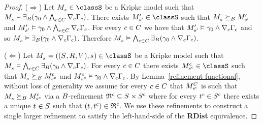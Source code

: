 \begin{proof}
($\Rightarrow$)
Let $\kPModel{\kStateS} \in \classS$ be a Kripke model such that $\kPModel{\kStateS} \entails \somerefsBs (\gamma_0 \land \bigwedge_{\agentC \in \agentsC} \coversC \Gamma_\agentC)$.
There exists $\kPModelP{\kStateSP} \in \classS$ such that $\kPModel{\kStateS} \simulatesBs \kPModelP{\kStateSP}$ and $\kPModelP{\kStateSP} \entails \gamma_0 \land \bigwedge_{\agentC \in \agentsC} \coversC \Gamma_\agentC$.
For every $\agentC \in \agentsC$ we have that $\kPModelP{\kStateSP} \entails \gamma_0 \land \coversC \Gamma_\agentC$ and so $\kPModel{\kStateS} \entails \somerefsBs (\gamma_0 \land \coversC \Gamma_\agentC)$.
Therefore $\kPModel{\kStateS} \entails \bigwedge_{\agentC \in \agentsC} \somerefsBs (\gamma_0 \land \coversC \Gamma_\agentC)$.

($\Leftarrow$)
Let $\kPModelAndTuple{\kStateS} \in \classS$ be a Kripke model such that $\kPModel{\kStateS} \entails \bigwedge_{\agentC \in \agentsC} \somerefsBs (\gamma_0 \land \coversC \Gamma_\agentC)$.
For every $\agentC \in \agentsC$ there exists $\kPModel[\agentC]{\kStateS[\agentC]} \in \classS$ such that $\kPModel{\kStateS} \simulatesBs \kPModel[\agentC]{\kStateS[\agentC]}$ and $\kPModel[\agentC]{\kStateS[\agentC]} \entails \gamma_0 \land \coversC \Gamma_\agentC$.
By Lemma~\ref{refinement-functional}, without loss of generality we assume for every $\agentC \in \agentsC$ that $\kPModel[\agentsC]{\kStateS[\agentC]}$ is such that $\kPModel{\kStateS} \simulatesBs \kPModel[\agentC]{\kStateS[\agentC]}$ via a $\agentsB$-refinement $\refinement^{\agentC} \subseteq \kStates \times \kStates[\agentC]$ where for every $\kStateT[\agentC] \in \kStates[\agentC]$ there exists a unique $\kStateT \in \kStates$ such that $(\kStateT, \kStateT[\agentC]) \in \refinement^{\agentC}$.
We use these refinements to construct a single larger refinement to satisfy the left-hand-side of the {\bf RDist} equivalence.


\end{proof}
